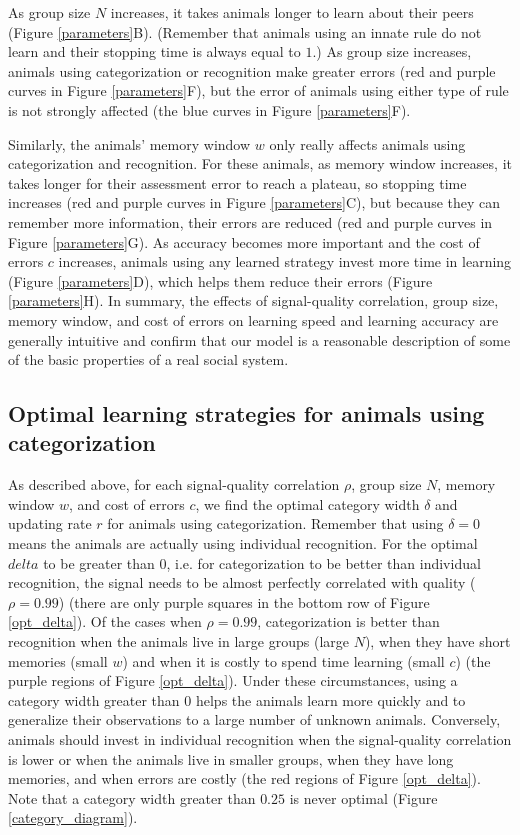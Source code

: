 As group size $N$ increases, it takes animals longer to learn about their peers (Figure \ref{parameters}B). (Remember that animals using an innate rule do not learn and their stopping time is always equal to $1$.) As group size increases, animals using categorization or recognition make greater errors (red and purple curves in Figure \ref{parameters}F), but the error of animals using either type of rule is not strongly affected (the blue curves in Figure \ref{parameters}F).

Similarly, the animals' memory window $w$ only really affects animals using categorization and recognition. For these animals, as memory window increases, it takes longer for their assessment error to reach a plateau, so stopping time increases (red and purple curves in Figure \ref{parameters}C), but because they can remember more information, their errors are reduced (red and purple curves in Figure \ref{parameters}G). As accuracy becomes more important and the cost of errors $c$ increases, animals using any learned strategy invest more time in learning (Figure \ref{parameters}D), which helps them reduce their errors (Figure \ref{parameters}H). In summary, the effects of  signal-quality correlation, group size, memory window, and cost of errors on learning speed and learning accuracy are generally intuitive and confirm that our model is a reasonable description of some of the basic properties of a real social system. 
  
\subsection*{Optimal learning strategies for animals using categorization}
As described above, for each signal-quality correlation $\rho$, group size $N$, memory window $w$, and cost of errors $c$, we find the optimal category width $\delta$ and updating rate $r$ for animals using categorization. Remember that using $\delta=0$ means the animals are actually using individual recognition. For the optimal $delta$ to be greater than $0$, i.e. for categorization to be better than individual recognition, the signal needs to be almost perfectly correlated with quality ($\rho=0.99$) (there are only purple squares in the bottom row of Figure \ref{opt_delta}). Of the cases when $\rho=0.99$, categorization is better than recognition when the animals live in large groups (large $N$), when they have short memories (small $w$) and when it is  costly to spend time learning (small $c$) (the purple regions of Figure \ref{opt_delta}). Under these circumstances, using a category width greater than $0$ helps the animals learn more quickly and to generalize their observations to a large number of unknown animals. Conversely, animals should invest in individual recognition when the signal-quality correlation is lower or when the animals live in smaller groups, when they have long memories, and when errors are costly (the red regions of Figure \ref{opt_delta}). Note that a category width greater than $0.25$ is never optimal (Figure \ref{category_diagram}). 


